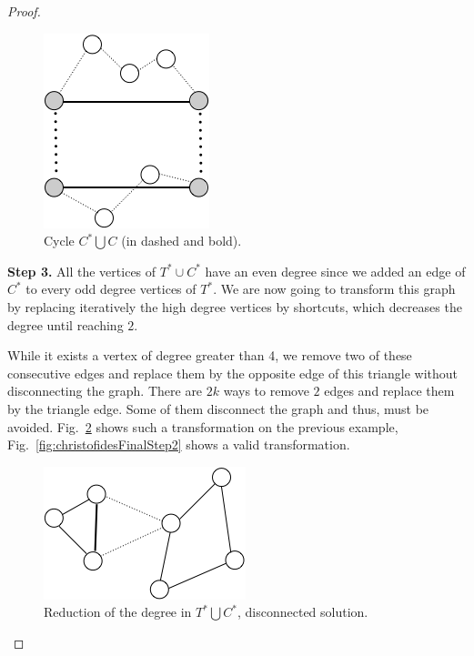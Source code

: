 \begin{proof}
\begin{figure}[hbt]
\begin{center}
       \includegraphics[scale=0.7]{FiguresGraph/perfectmatching3}
       \caption{Cycle $C^* \bigcup C$ (in dashed and bold).}
              \label{fig:perfectMatchingC}
\end{center}
\end{figure}

\bigskip

\textbf{Step 3.} 
All the vertices of $T^* \cup C^*$ have an even degree since we added an edge of $C^*$ to every odd degree vertices of $T^*$. 
We are now going to transform this graph by replacing iteratively the high degree vertices by shortcuts, which decreases the degree until reaching $2$. 

While it exists a vertex of degree greater than 4, we remove two of these consecutive edges and replace them by the opposite edge of this triangle 
without disconnecting the graph. There are $2k$ ways to remove $2$ edges and replace them by the triangle edge. Some of them disconnect the graph
and thus, must be avoided. 
Fig.~\ref{fig:christofidesFinalStep1} shows such a transformation on the previous example, 
Fig.~\ref{fig:christofidesFinalStep2} shows a valid transformation.

\begin{figure}[hbt]
\begin{center}
       \includegraphics[scale=0.6]{FiguresGraph/christofides4}
       \caption{Reduction of the degree in $T^* \bigcup C^*$, disconnected solution.}
              \label{fig:christofidesFinalStep1}
\end{center}
\end{figure}


\end{proof}
